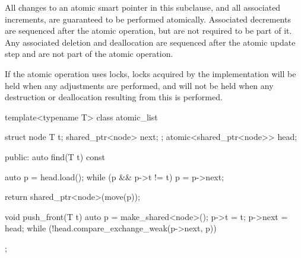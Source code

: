 \pnum
All changes to an atomic smart pointer in this subclause, and
all associated  increments,
are guaranteed to be performed atomically.
Associated  decrements
are sequenced after the atomic operation,
but are not required to be part of it.
Any associated deletion and deallocation
are sequenced after the atomic update step and
are not part of the atomic operation.
\begin{note}
If the atomic operation uses locks,
locks acquired by the implementation
will be held when any  adjustments are performed, and
will not be held when any destruction or deallocation
resulting from this is performed.
\end{note}

\pnum
\begin{example}
\begin{codeblock}
template<typename T> class atomic_list {
  struct node {
    T t;
    shared_ptr<node> next;
  };
  atomic<shared_ptr<node>> head;

public:
  auto find(T t) const {
    auto p = head.load();
    while (p && p->t != t)
      p = p->next;

    return shared_ptr<node>(move(p));
  }

  void push_front(T t) {
    auto p = make_shared<node>();
    p->t = t;
    p->next = head;
    while (!head.compare_exchange_weak(p->next, p)) {}
  }
};
\end{codeblock}
\end{example}

